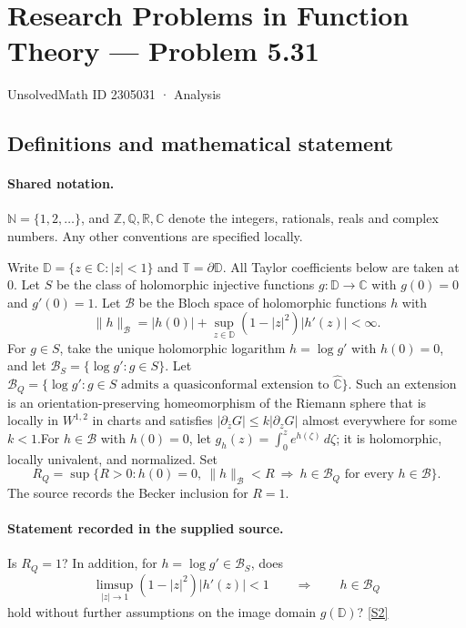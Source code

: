 \documentclass[11pt]{article}
\newcommand{\sref}[2]{\hyperlink{source:#1:#2}{[S#2]}}
\begin{document}
\setcounter{section}{2305030}
\section{Research Problems in Function Theory — Problem 5.31}\label{2305031}
{\small\sffamily UnsolvedMath ID 2305031 · Analysis}
\subsection{Definitions and mathematical statement}

\paragraph{Shared notation.}$\mathbb N=\{1,2,\ldots\}$, and $\mathbb Z,\mathbb Q,\mathbb R,\mathbb C$ denote the integers, rationals, reals and complex numbers. Any other conventions are specified locally.


Write $\mathbb D=\{z\in\mathbb C:|z|<1\}$ and $\mathbb T=\partial\mathbb D$. All Taylor coefficients below are taken at $0$. Let $S$ be the class of holomorphic injective functions $g:\mathbb D\to\mathbb C$ with $g(0)=0$ and $g'(0)=1$. Let $\mathcal B$ be the Bloch space of holomorphic functions $h$ with
\[\|h\|_{\mathcal B}=|h(0)|+\sup_{z\in\mathbb D}(1-|z|^2)|h'(z)|<\infty.
\]
For $g\in S$, take the unique holomorphic logarithm $h=\log g'$ with $h(0)=0$, and let $\mathcal B_S=\{\log g':g\in S\}$. Let $\mathcal B_Q=\{\log g':g\in S\text{ admits a quasiconformal extension to }\widehat{\mathbb C}\}$. Such an extension is an orientation-preserving homeomorphism of the Riemann sphere that is locally in $W^{1,2}$ in charts and satisfies $|\partial_{\bar z}G|\le k|\partial_zG|$ almost everywhere for some $k<1$.For $h\in\mathcal B$ with $h(0)=0$, let $g_h(z)=\int_0^z e^{h(\zeta)}\,d\zeta$; it is holomorphic, locally univalent, and normalized. Set
\[R_Q=\sup\{R>0:h(0)=0,\ \|h\|_{\mathcal B}<R\ \Longrightarrow\ h\in\mathcal B_Q\text{ for every }h\in\mathcal B\}.
\]
The source records the Becker inclusion for $R=1$.
\paragraph{Statement recorded in the supplied source.}
Is $R_Q=1$? In addition, for $h=\log g'\in\mathcal B_S$, does
\[\limsup_{|z|\to1}(1-|z|^2)|h'(z)|<1\qquad\Longrightarrow\qquad h\in\mathcal B_Q
\]
hold without further assumptions on the image domain $g(\mathbb D)$? \sref{2305031}{2}
\end{document}
